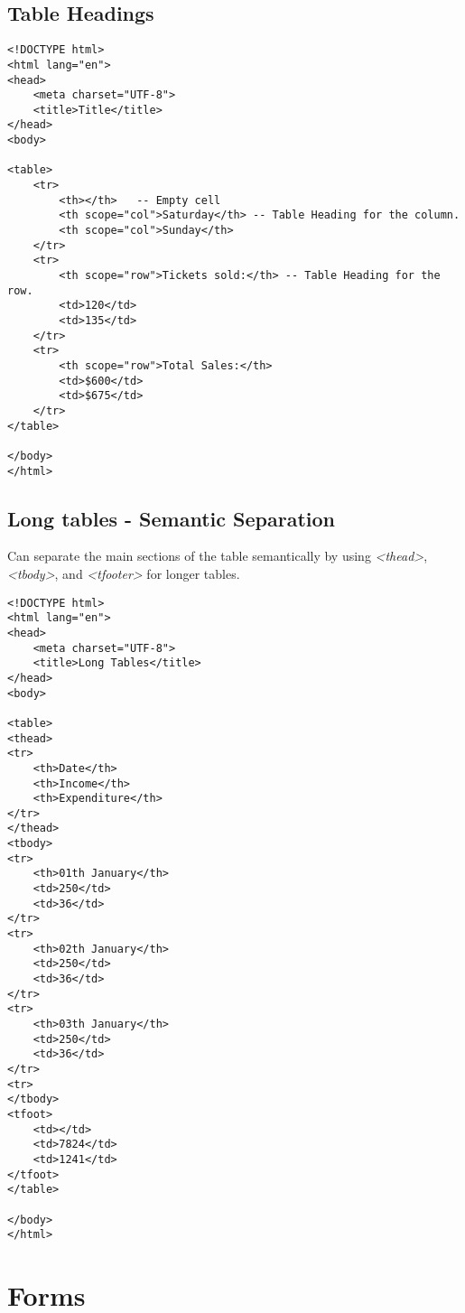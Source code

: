 \documentclass[]{article}
\newcommand{\<}{\guilsinglleft}
\renewcommand{\>}{\guilsinglright}
\renewcommand{\it}[1]{\textit{#1}}
\begin{document}
\subsection{Table Headings}
\begin{lstlisting}
<!DOCTYPE html>
<html lang="en">
<head>
	<meta charset="UTF-8">
	<title>Title</title>
</head>
<body>

<table>
	<tr>
		<th></th>	-- Empty cell
		<th scope="col">Saturday</th> -- Table Heading for the column.
		<th scope="col">Sunday</th>
	</tr>
	<tr>
		<th scope="row">Tickets sold:</th> -- Table Heading for the row.
		<td>120</td>
		<td>135</td>
	</tr>
	<tr>
		<th scope="row">Total Sales:</th>
		<td>$600</td>
		<td>$675</td>
	</tr>
</table>

</body>
</html>
\end{lstlisting}

\subsection{Long tables - Semantic Separation}
Can separate the main sections of the table semantically by using \it{<thead>}, \it{<tbody>}, and \it{<tfooter>} for longer tables.
\begin{lstlisting}
<!DOCTYPE html>
<html lang="en">
<head>
	<meta charset="UTF-8">
	<title>Long Tables</title>
</head>
<body>

<table>
<thead>
<tr>
	<th>Date</th>
	<th>Income</th>
	<th>Expenditure</th>
</tr>
</thead>
<tbody>
<tr>
	<th>01th January</th>
	<td>250</td>
	<td>36</td>
</tr>
<tr>
	<th>02th January</th>
	<td>250</td>
	<td>36</td>
</tr>
<tr>
	<th>03th January</th>
	<td>250</td>
	<td>36</td>
</tr>
<tr>
</tbody>
<tfoot>
	<td></td>
	<td>7824</td>
	<td>1241</td>
</tfoot>
</table>

</body>
</html>
\end{lstlisting}


\section{Forms}
\end{document}
